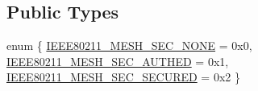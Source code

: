 \subsection*{Public Types}
\begin{DoxyCompactItemize}
\item 
enum \{ \hyperlink{structieee80211__if__mesh_abed82baf7f470b522273a3e37c24c600aa331dabfdfb64a090cab58b911900030}{I\-E\-E\-E80211\-\_\-\-M\-E\-S\-H\-\_\-\-S\-E\-C\-\_\-\-N\-O\-N\-E} = 0x0, 
\hyperlink{structieee80211__if__mesh_abed82baf7f470b522273a3e37c24c600a5c7f982c3bea5482bd1f92f95466f7d4}{I\-E\-E\-E80211\-\_\-\-M\-E\-S\-H\-\_\-\-S\-E\-C\-\_\-\-A\-U\-T\-H\-E\-D} = 0x1, 
\hyperlink{structieee80211__if__mesh_abed82baf7f470b522273a3e37c24c600ae1b4bbdd667c8ca83ce0c15e4cad1e75}{I\-E\-E\-E80211\-\_\-\-M\-E\-S\-H\-\_\-\-S\-E\-C\-\_\-\-S\-E\-C\-U\-R\-E\-D} = 0x2
 \}
\end{DoxyCompactItemize}
